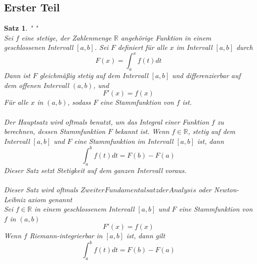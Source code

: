 \documentclass[fontsize=12pt,paper=a4,DIV12,cleardoublepage=empty, 
liststotoc,idxtotoc,bibtotoc]{article}
\newcommand{\RR}{\mathbb{R}}
\theoremstyle{plain}
\newtheorem{satz}{Satz}[subsection]
\theoremstyle{definition}
\begin{document}
	\subsection{Erster Teil}
	\begin{satz}" "\\
		Sei $f$ eine stetige, der Zahlenmenge $\RR$ angehörige Funktion in einem geschlossenen Intervall $[a, b]$. Sei $F$ definiert für alle $x$ im Intervall $[a, b]$ durch \\
			\begin{equation}
				F(x)=\int_{a}^{x}f(t) dt
			\end{equation}
		Dann ist $F$ gleichmäßig stetig auf dem Intervall $[a, b]$ und differenzierbar auf dem offenen Intervall $(a, b)$, und 
			\begin{equation}
				F'(x)=f(x)
			\end{equation}
		Für alle $x$ in $(a, b)$, sodass $F$ eine Stammfunktion von $f$ ist.\\\\

		Der Hauptsatz wird oftmals benutzt, um das Integral einer Funktion $f$ zu berechnen, dessen Stammfunktion $F$ bekannt ist. Wenn $f \in \RR$, stetig auf dem Intervall $[a, b]$ und $F$ eine Stammfunktion im Intervall $[a, b]$ ist, dann
		\begin{equation}
			\int_{a}^{b}f(t) dt=F(b)-F(a)
		\end{equation}
		Dieser Satz setzt Stetigkeit auf dem ganzen Intervall voraus.\\\\
	
	Dieser Satz wird oftmals $Zweiter Fundamentalsatz der Analysis$ oder Newton-Leibniz axiom genannt\\
	Sei $f \in \RR$ in einem geschlossenem Intervall $[a, b]$ und $F$ eine Stammfunktion von $f$ in $(a, b)$
	\begin{equation}
		F'(x)=f(x)
	\end{equation}
	Wenn $f$ Riemann-integrierbar in $[a, b]$ ist, dann gilt
	\begin{equation}
		\int_{a}^{b}f(t) dt = F(b)-F(a)
	\end{equation}
	
	\end{satz}
	
\end{document}
